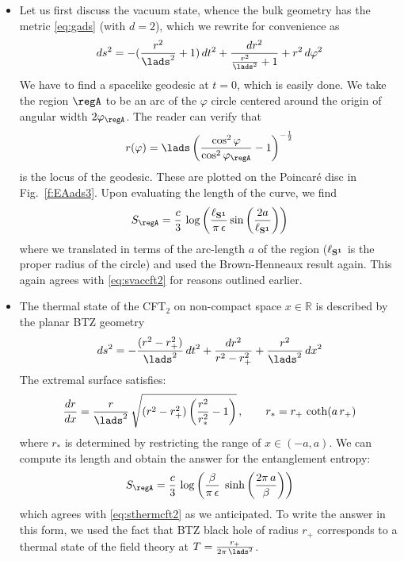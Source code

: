 \documentclass[12pt,openany]{book}
\begin{document}
\begin{itemize}
\item  Let us first  discuss the vacuum state, whence the  bulk geometry has the metric \eqref{eq:gads} (with $d=2$), which we rewrite for convenience as
%
\begin{equation}
ds^2 = -(\frac{r^2}{\lads^2}+1)\, dt^2 + \frac{dr^2}{\frac{r^2}{\lads^2}+1} + r^2\, d\varphi^2
\end{equation}
%
We have to find a spacelike geodesic at $t=0$, which is easily done. We take the region
$\regA$ to be an arc of the $\varphi$ circle centered around the origin of angular width $2\varphi_\regA$.
The reader can verify that
%
\begin{equation}
r(\varphi) = \lads \left(\frac{\cos^2\varphi}{\cos^2 \varphi_\regA} - 1\right)^{-\frac{1}{2}}
\label{eq:Extads}
\end{equation}
%
is the locus of the geodesic.  These are plotted on the Poincar\'e disc in Fig.~\ref{f:EAads3}.
Upon evaluating the length  of the curve, we find
%
\begin{equation}
S_\regA
= \frac{c}{3}\, \log\left(\frac{\ell_{{\bf S^1}}}{\pi\, \epsilon} \sin\left(\frac{2a}{\ell_{{\bf S^1}}}\right) \right)
\label{}
\end{equation}
%
where we translated in terms of the arc-length $a$ of the region ($\ell_{{\bf S^1}}$ is the  proper radius of the circle) and used the Brown-Henneaux result again. This again agrees with \eqref{eq:svaccft2} for reasons outlined earlier.

\item The thermal state of the CFT$_2$ on non-compact space $x\in {\mathbb R}$ is described by the planar  BTZ geometry
%
\begin{equation}
ds^2 = -\frac{(r^2- r_+^2 )}{\lads^2}\, dt^2 + \frac{dr^2}{r^2-r_+^2} + \frac{r^2}{\lads^2}\, dx^2
\label{eq:pbtz}
\end{equation}
%
The extremal surface satisfies:
%
\begin{equation}
\frac{dr}{dx} = \frac{r}{\lads^2}\, \sqrt{(r^2 - r_+^2) \left( \frac{r^2}{r_*^2}-1\right)}\,,\qquad r_* = r_+\, \coth(a\, r_+)
\label{}
\end{equation}
%
where $r_*$ is  determined by restricting the range of $x \in (-a,a)$.  We can compute its length and obtain the answer for the entanglement entropy:
%
\begin{equation}
S_\regA = \frac{c}{3}\, \log\left(\frac{\beta}{\pi\,\epsilon}\; \sinh\left(\frac{2\pi\,a}{\beta}\right) \right)
\label{}
\end{equation}
which agrees with \eqref{eq:sthermcft2} as we anticipated. To write the answer in this form, we used the fact that BTZ black hole of radius $r_+$ corresponds to a thermal state of the field theory at $T = \frac{r_+}{2\pi\,\lads^2}$.
%
\end{itemize}
\end{document}
